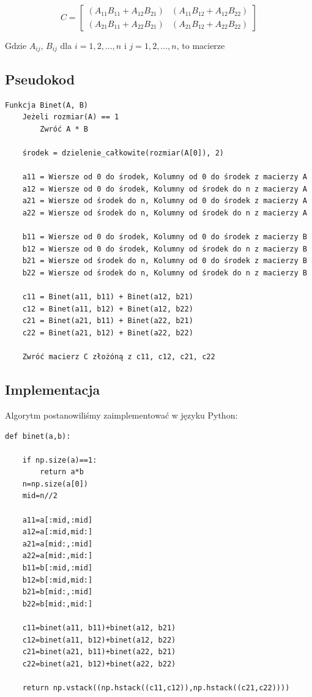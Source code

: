 \documentclass{article}
\begin{document}
\[
C =
\begin{bmatrix}
(A_{11}B_{11} + A_{12}B_{21}) & (A_{11}B_{12} + A_{12}B_{22}) \\
(A_{21}B_{11} + A_{22}B_{21}) & (A_{21}B_{12} + A_{22}B_{22})
\end{bmatrix}
\]

\bigbreak
\noindent
Gdzie \(A_{ij}\), \(B_{ij}\) dla \(i = {1, 2, ..., n}\) i \({j = {1, 2, ..., n}}\), to macierze


\subsection{Pseudokod}

\begin{verbatim}
Funkcja Binet(A, B)
    Jeżeli rozmiar(A) == 1
        Zwróć A * B

    środek = dzielenie_całkowite(rozmiar(A[0]), 2) 
    
    a11 = Wiersze od 0 do środek, Kolumny od 0 do środek z macierzy A
    a12 = Wiersze od 0 do środek, Kolumny od środek do n z macierzy A
    a21 = Wiersze od środek do n, Kolumny od 0 do środek z macierzy A
    a22 = Wiersze od środek do n, Kolumny od środek do n z macierzy A
    
    b11 = Wiersze od 0 do środek, Kolumny od 0 do środek z macierzy B
    b12 = Wiersze od 0 do środek, Kolumny od środek do n z macierzy B
    b21 = Wiersze od środek do n, Kolumny od 0 do środek z macierzy B
    b22 = Wiersze od środek do n, Kolumny od środek do n z macierzy B

    c11 = Binet(a11, b11) + Binet(a12, b21)
    c12 = Binet(a11, b12) + Binet(a12, b22)
    c21 = Binet(a21, b11) + Binet(a22, b21)
    c22 = Binet(a21, b12) + Binet(a22, b22)

    Zwróć macierz C złożóną z c11, c12, c21, c22
\end{verbatim}

\subsection{Implementacja}

Algorytm postanowiliśmy zaimplementować w języku Python:

\begin{verbatim}
def binet(a,b):
    
    if np.size(a)==1:
        return a*b
    n=np.size(a[0])
    mid=n//2
    
    a11=a[:mid,:mid]
    a12=a[:mid,mid:]
    a21=a[mid:,:mid]
    a22=a[mid:,mid:]
    b11=b[:mid,:mid]
    b12=b[:mid,mid:]
    b21=b[mid:,:mid]
    b22=b[mid:,mid:]

    c11=binet(a11, b11)+binet(a12, b21)
    c12=binet(a11, b12)+binet(a12, b22)
    c21=binet(a21, b11)+binet(a22, b21)
    c22=binet(a21, b12)+binet(a22, b22)

    return np.vstack((np.hstack((c11,c12)),np.hstack((c21,c22))))
\end{verbatim}
\end{document}
